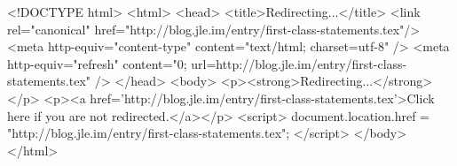 <!DOCTYPE html>
<html>
<head>
<title>Redirecting...</title>
<link rel="canonical" href="http://blog.jle.im/entry/first-class-statements.tex"/>
<meta http-equiv="content-type" content="text/html; charset=utf-8" />
<meta http-equiv="refresh" content="0; url=http://blog.jle.im/entry/first-class-statements.tex" />
</head>
<body>
  <p><strong>Redirecting...</strong></p>
  <p><a href='http://blog.jle.im/entry/first-class-statements.tex'>Click here if you are not redirected.</a></p>
  <script>
    document.location.href = "http://blog.jle.im/entry/first-class-statements.tex";
  </script>
</body>
</html>
